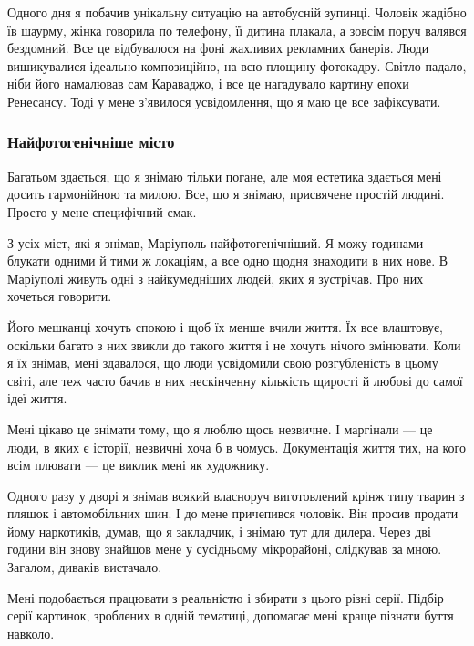 Одного дня я побачив унікальну ситуацію на автобусній зупинці. Чоловік жадібно
їв шаурму, жінка говорила по телефону, її дитина плакала, а зовсім поруч
валявся бездомний. Все це відбувалося на фоні жахливих рекламних банерів. Люди
вишикувалися ідеально композиційно, на всю площину фотокадру. Світло падало,
ніби його намалював сам Караваджо, і все це нагадувало картину епохи Ренесансу.
Тоді у мене з'явилося усвідомлення, що я маю це все зафіксувати.

\subsubsection{Найфотогенічніше місто}

Багатьом здається, що я знімаю тільки погане, але моя естетика здається мені
досить гармонійною та милою. Все, що я знімаю, присвячене простій людині.
Просто у мене специфічний смак.

З усіх міст, які я знімав, Маріуполь найфотогенічніший. Я можу годинами блукати
одними й тими ж локаціям, а все одно щодня знаходити в них нове. В Маріуполі
живуть одні з найкумедніших людей, яких я зустрічав. Про них хочеться говорити.


Його мешканці хочуть спокою і щоб їх менше вчили життя. Їх все влаштовує,
оскільки багато з них звикли до такого життя і не хочуть нічого змінювати. Коли
я їх знімав, мені здавалося, що люди усвідомили свою розгубленість в цьому
світі, але теж часто бачив в них нескінченну кількість щирості й любові до
самої ідеї життя.

Мені цікаво це знімати тому, що я люблю щось незвичне. І маргінали — це люди, в
яких є історії, незвичні хоча б в чомусь. Документація життя тих, на кого всім
плювати — це виклик мені як художнику.


Одного разу у дворі я знімав всякий власноруч виготовлений крінж типу тварин з
пляшок і автомобільних шин. І до мене причепився чоловік. Він просив продати
йому наркотиків, думав, що я закладчик, і знімаю тут для дилера. Через дві
години він знову знайшов мене у сусідньому мікрорайоні, слідкував за мною.
Загалом, диваків вистачало. 

Мені подобається працювати з реальністю і збирати з цього різні серії. Підбір
серії картинок, зроблених в одній тематиці, допомагає мені краще пізнати буття
навколо.

